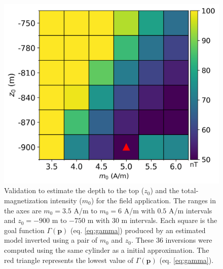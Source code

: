 \begin{figure}
	\centering
	\includegraphics[scale=.75]{figures/real_gamma.png}
	\caption{Validation to estimate the depth to the top ($ z_0 $) and the total-magnetization intensity ($ m_0 $) for the field application. The ranges in the axes are $m_0 = 3.5$ A/m to $m_0=6$ A/m with $0.5$ A/m intervals and $z_0=-900$ m to $-750$ m with $30$ m intervals. Each square is the goal function $ \Gamma(\mathbf{p}) $ (eq. \ref{eq:gamma}) produced by an estimated model inverted using a pair of $m_0$ and $z_0$. These 36 inversions were computed using the same cylinder as a initial approximation. The red triangle represents the lowest value of $ \Gamma(\mathbf{p}) $ (eq. \ref{eq:gamma}).
	}
	\label{fig:real_map}
\end{figure}

